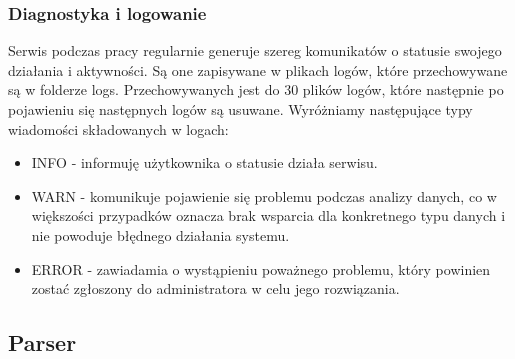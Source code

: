 \documentclass[a4paper]{book}
\begin{document}
\subsubsection{Diagnostyka i logowanie}
Serwis podczas pracy regularnie generuje szereg komunikatów o statusie swojego działania i aktywności.
Są one zapisywane w plikach logów, które przechowywane są w folderze logs. Przechowywanych jest do 30 plików logów, które następnie po pojawieniu się następnych logów są usuwane.
Wyróżniamy następujące typy wiadomości składowanych w logach:
\begin{itemize}
	\item INFO - informuję użytkownika o statusie działa serwisu.
	\item WARN - komunikuje pojawienie się problemu podczas analizy danych, co w większości przypadków oznacza brak wsparcia dla konkretnego typu danych i nie powoduje błędnego działania systemu.
	\item ERROR - zawiadamia o wystąpieniu poważnego problemu, który powinien zostać zgłoszony do administratora w celu jego rozwiązania.
\end{itemize}
\subsection{Parser}
\end{document}
